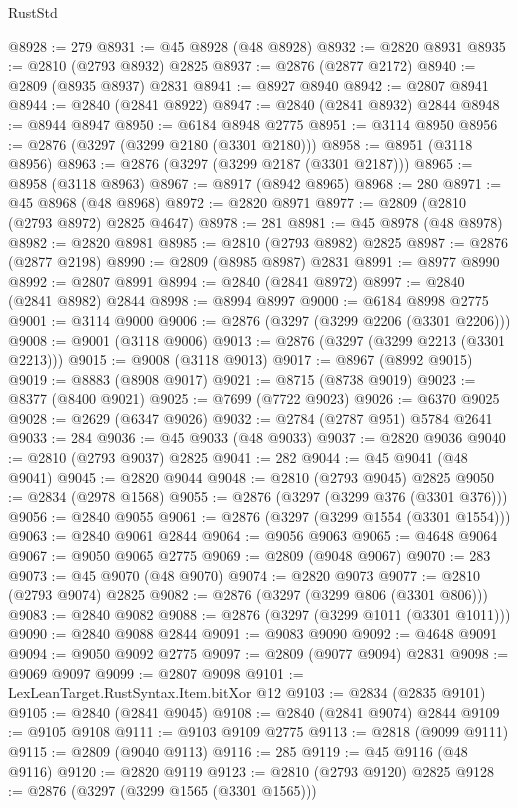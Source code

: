 \begin{lexlean}{RustStd}
\begin{coremodule}
{\begin{coremodule}
{{{{{{{{{{{{{{{{{{{{{{{{{{{{{{{{{@8928 := 279
@8931 := @45 @8928 (@48 @8928)
@8932 := @2820 @8931
@8935 := @2810 (@2793 @8932) @2825
@8937 := @2876 (@2877 @2172)
@8940 := @2809 (@8935 @8937) @2831
@8941 := @8927 @8940
@8942 := @2807 @8941
@8944 := @2840 (@2841 @8922)
@8947 := @2840 (@2841 @8932) @2844
@8948 := @8944 @8947
@8950 := @6184 @8948 @2775
@8951 := @3114 @8950
@8956 := @2876 (@3297 (@3299 @2180 (@3301 @2180)))
@8958 := @8951 (@3118 @8956)
@8963 := @2876 (@3297 (@3299 @2187 (@3301 @2187)))
@8965 := @8958 (@3118 @8963)
@8967 := @8917 (@8942 @8965)
@8968 := 280
@8971 := @45 @8968 (@48 @8968)
@8972 := @2820 @8971
@8977 := @2809 (@2810 (@2793 @8972) @2825 @4647)
@8978 := 281
@8981 := @45 @8978 (@48 @8978)
@8982 := @2820 @8981
@8985 := @2810 (@2793 @8982) @2825
@8987 := @2876 (@2877 @2198)
@8990 := @2809 (@8985 @8987) @2831
@8991 := @8977 @8990
@8992 := @2807 @8991
@8994 := @2840 (@2841 @8972)
@8997 := @2840 (@2841 @8982) @2844
@8998 := @8994 @8997
@9000 := @6184 @8998 @2775
@9001 := @3114 @9000
@9006 := @2876 (@3297 (@3299 @2206 (@3301 @2206)))
@9008 := @9001 (@3118 @9006)
@9013 := @2876 (@3297 (@3299 @2213 (@3301 @2213)))
@9015 := @9008 (@3118 @9013)
@9017 := @8967 (@8992 @9015)
@9019 := @8883 (@8908 @9017)
@9021 := @8715 (@8738 @9019)
@9023 := @8377 (@8400 @9021)
@9025 := @7699 (@7722 @9023)
@9026 := @6370 @9025
@9028 := @2629 (@6347 @9026)
@9032 := @2784 (@2787 @951) @5784 @2641
@9033 := 284
@9036 := @45 @9033 (@48 @9033)
@9037 := @2820 @9036
@9040 := @2810 (@2793 @9037) @2825
@9041 := 282
@9044 := @45 @9041 (@48 @9041)
@9045 := @2820 @9044
@9048 := @2810 (@2793 @9045) @2825
@9050 := @2834 (@2978 @1568)
@9055 := @2876 (@3297 (@3299 @376 (@3301 @376)))
@9056 := @2840 @9055
@9061 := @2876 (@3297 (@3299 @1554 (@3301 @1554)))
@9063 := @2840 @9061 @2844
@9064 := @9056 @9063
@9065 := @4648 @9064
@9067 := @9050 @9065 @2775
@9069 := @2809 (@9048 @9067)
@9070 := 283
@9073 := @45 @9070 (@48 @9070)
@9074 := @2820 @9073
@9077 := @2810 (@2793 @9074) @2825
@9082 := @2876 (@3297 (@3299 @806 (@3301 @806)))
@9083 := @2840 @9082
@9088 := @2876 (@3297 (@3299 @1011 (@3301 @1011)))
@9090 := @2840 @9088 @2844
@9091 := @9083 @9090
@9092 := @4648 @9091
@9094 := @9050 @9092 @2775
@9097 := @2809 (@9077 @9094) @2831
@9098 := @9069 @9097
@9099 := @2807 @9098
@9101 := LexLeanTarget.RustSyntax.Item.bitXor @12
@9103 := @2834 (@2835 @9101)
@9105 := @2840 (@2841 @9045)
@9108 := @2840 (@2841 @9074) @2844
@9109 := @9105 @9108
@9111 := @9103 @9109 @2775
@9113 := @2818 (@9099 @9111)
@9115 := @2809 (@9040 @9113)
@9116 := 285
@9119 := @45 @9116 (@48 @9116)
@9120 := @2820 @9119
@9123 := @2810 (@2793 @9120) @2825
@9128 := @2876 (@3297 (@3299 @1565 (@3301 @1565)))
}}}}}}}}}}}}}}}}}}}}}}}}}}}}}}}}}
\end{coremodule}}
\end{coremodule}
\end{lexlean}
